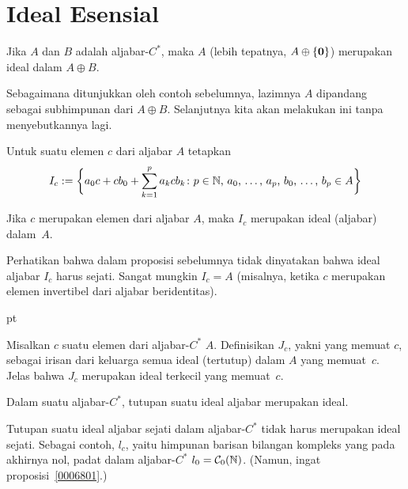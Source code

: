 \section{Ideal Esensial}
\begin{exam} Jika $A$ dan $B$ adalah aljabar-$C^*$, maka $A$ (lebih tepatnya, $A \oplus \{\mathbf{0}\}$) merupakan ideal dalam $A \oplus B$.
\end{exam}

\begin{conv} Sebagaimana ditunjukkan oleh contoh sebelumnya, lazimnya $A$ dipandang sebagai
subhimpunan dari $A \oplus B$. Selanjutnya kita akan melakukan ini tanpa menyebutkannya lagi.
\end{conv}

\begin{notn} Untuk suatu elemen $c$ dari aljabar $A$
tetapkan
  \[ I_c := \biggl\{a_0c + cb_0 + \sum_{k=1}^p a_kcb_k \colon
   \text{$p \in \mathbb{N}$, $a_0$, \dots, $a_p$, $b_0$, \dots, $b_p \in A$}\biggr\} \]
\end{notn}

\begin{prop} Jika $c$ merupakan elemen dari aljabar $A$, maka $I_c$ merupakan ideal
(aljabar) dalam~$A$.
\end{prop}

Perhatikan bahwa dalam proposisi sebelumnya tidak dinyatakan bahwa ideal aljabar $I_c$
harus sejati. Sangat mungkin $I_c = A$ (misalnya, ketika $c$ merupakan
elemen invertibel dari aljabar beridentitas).

 pt

\begin{defn} Misalkan $c$ suatu elemen dari aljabar-$C^*$ $A$.
Definisikan $J_c$, yakni  yang memuat $c$, sebagai irisan dari
keluarga semua ideal (tertutup) dalam $A$ yang memuat~$c$. Jelas bahwa $J_c$ merupakan ideal terkecil
yang memuat~$c$.
\end{defn}

\begin{prop} Dalam suatu aljabar-$C^*$, tutupan suatu ideal aljabar merupakan ideal.
\end{prop}

\begin{exam} Tutupan suatu ideal aljabar sejati dalam aljabar-$C^*$ tidak harus merupakan
ideal sejati. Sebagai contoh, $l_c$, yaitu himpunan barisan bilangan kompleks yang
pada akhirnya nol, padat dalam aljabar-$C^*$ $l_0 = \mathcal{C}_0(\mathbb{N})$. (Namun, ingat
proposisi~\ref{0006801}.)
\end{exam}

